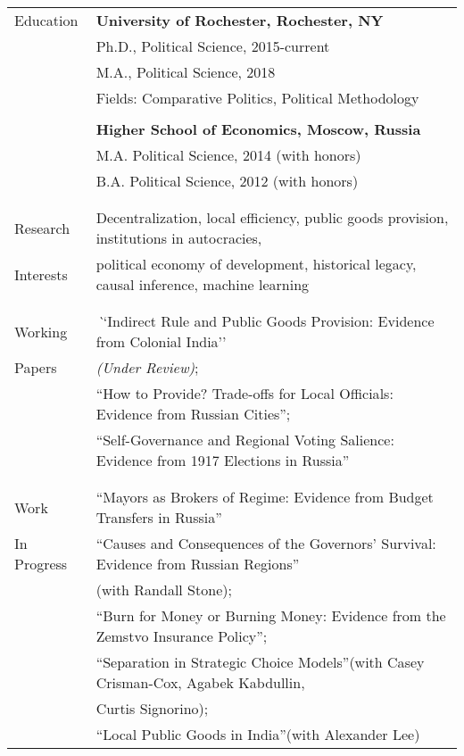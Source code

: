 \documentclass[letterpaper,11pt,oneside]{article}
\begin{document}
\noindent \begin{tabular}{@{} l l}
 \Large{Education}    & \textbf{University of Rochester, Rochester, NY} \\
     & Ph.D., Political Science, 2015-current \\
     & M.A., Political Science, 2018 \\
     & Fields: Comparative Politics, Political Methodology \\
     \vspace*{-2mm}
     & \\
     & \textbf{Higher School of Economics, Moscow, Russia} \\
     & M.A. Political Science, 2014 (with honors) \\
     & B.A. Political Science, 2012 (with honors) \\
     & \\
&\\
\Large{Research} & Decentralization, local efficiency, public goods provision,  institutions in autocracies,  \\
\Large{Interests} &political economy of development, historical legacy, causal inference, machine learning\\
 & \\
&\\
\Large{Working}
 & \textit``Indirect Rule and Public Goods Provision: Evidence from Colonial  India''\\
 \Large{Papers}& \textit{(Under Review)};\\
 & ``How to Provide? Trade-offs for Local Officials: Evidence from Russian Cities'';\\
 &   ``Self-Governance and Regional Voting Salience: Evidence from 1917 Elections in Russia''\\
  & \\
 &\\
 \Large{Work}
 & ``Mayors as Brokers of Regime: Evidence from Budget Transfers in Russia''\\
  \Large{In Progress} &``Causes and Consequences of the Governors' Survival: Evidence from Russian Regions''\\
  & (with Randall Stone);\\
 & ``Burn for Money or Burning Money: Evidence from the Zemstvo Insurance Policy'';\\
 &``Separation in Strategic Choice Models''(with Casey Crisman-Cox, Agabek Kabdullin,\\
 &  Curtis Signorino);\\
  & ``Local Public Goods in India''(with Alexander Lee)\\

\end{tabular}
\end{document}
